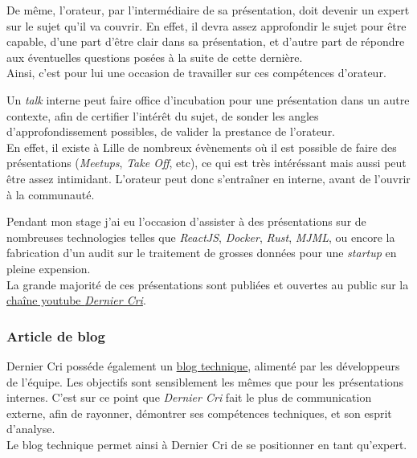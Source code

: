 \bigskip

De même, l'orateur, par l'intermédiaire de sa présentation, doit devenir
un expert sur le sujet qu'il va couvrir. En effet, il devra assez
approfondir le sujet pour être capable, d'une part d'être clair dans sa
présentation, et d'autre part de répondre aux éventuelles questions
posées à la suite de cette dernière.\\
Ainsi, c'est pour lui une occasion de travailler sur ces compétences
d'orateur.

\bigskip

Un \emph{talk} interne peut faire office d'incubation pour une
présentation dans un autre contexte, afin de certifier l'intérêt du
sujet, de sonder les angles d'approfondissement possibles, de valider la
prestance de l'orateur.\\
En effet, il existe à Lille de nombreux évènements où il est possible de
faire des présentations (\emph{Meetups}, \emph{Take Off}, etc), ce qui
est très intéréssant mais aussi peut être assez intimidant. L'orateur
peut donc s'entraîner en interne, avant de l'ouvrir à la communauté.

\bigskip

Pendant mon stage j'ai eu l'occasion d'assister à des présentations sur
de nombreuses technologies telles que \emph{ReactJS}, \emph{Docker},
\emph{Rust}, \emph{MJML}, ou encore la fabrication d'un audit sur le
traitement de grosses données pour une \emph{startup} en pleine
expension.\\
La grande majorité de ces présentations sont publiées et ouvertes au
public sur la
\href{https://www.youtube.com/channel/UCDfdBlzldhg_PEu3xZTPsHg}{chaîne
youtube \emph{Dernier Cri}}.

\bigskip

\subsubsection{Article de blog}\label{article-de-blog}

\bigskip

Dernier Cri posséde également un
\href{http://derniercri.io/tech-blog}{blog technique}, alimenté par les
développeurs de l'équipe. Les objectifs sont sensiblement les mêmes que
pour les présentations internes. C'est sur ce point que \emph{Dernier
Cri} fait le plus de communication externe, afin de rayonner, démontrer
ses compétences techniques, et son esprit d'analyse.\\
Le blog technique permet ainsi à Dernier Cri de se positionner en tant
qu'expert.

